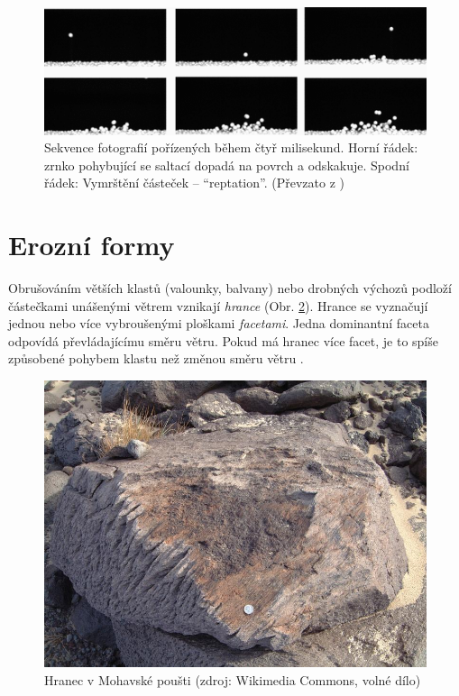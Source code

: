 \begin{figure}
	\centering
	\includegraphics[width=1\linewidth]{obrazky/eolicka/saltace_foto}
	\caption{Sekvence fotografií pořízených během čtyř milisekund. Horní řádek: zrnko pohybující se saltací dopadá na povrch a odskakuje. Spodní řádek: Vymrštění částeček -- \enquote{reptation}. (Převzato z \textcite{beladjineCollisionProcessIncident2007})}
	\label{fig:saltacefoto}
\end{figure}


%

\section{Erozní formy}
Obrušováním větších klastů (valounky, balvany) nebo drobných výchozů podloží částečkami unášenými větrem vznikají \emph{hrance} (Obr. \ref{fig:hranec}). Hrance se vyznačují jednou nebo více vybroušenými ploškami \emph{facetami}. Jedna dominantní faceta odpovídá převládajícímu směru větru. Pokud má hranec více facet, je to spíše způsobené pohybem klastu než změnou směru větru \parencite{livingstoneAeolianGeomorphologyNew2019}.
\begin{figure}
	\centering
	\includegraphics[width=1\linewidth]{obrazky/eolicka/ventifact_mojave}
	\caption{Hranec v Mohavské poušti (zdroj: Wikimedia Commons, volné dílo)}
	\label{fig:hranec}
\end{figure}

